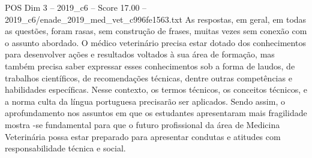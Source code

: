 \begin{textsample}{POS Dim 3 – 2019\_c6 – Score 17.00 – 2019\_c6/enade\_2019\_med\_vet\_c996fe1563.txt}
As respostas, em geral, em todas as questões, foram rasas, sem construção de frases, muitas vezes sem conexão com o assunto abordado.
O médico veterinário precisa estar dotado dos conhecimentos para desenvolver ações e resultados voltados à sua área de formação, mas também precisa saber expressar esses conhecimentos sob a forma de laudos, de trabalhos científicos, de recomendações técnicas, dentre outras competências e habilidades específicas.
Nesse contexto, os termos técnicos, os conceitos técnicos, e a norma culta da língua portuguesa precisarão ser aplicados.
Sendo assim, o aprofundamento nos assuntos em que os estudantes apresentaram mais fragilidade mostra -se fundamental para que o futuro profissional da área de Medicina Veterinária possa estar preparado para apresentar condutas e atitudes com responsabilidade técnica e social.

\end{textsample}
